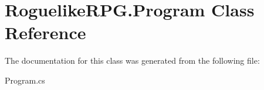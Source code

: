 \hypertarget{class_roguelike_r_p_g_1_1_program}{}\section{Roguelike\+R\+P\+G.\+Program Class Reference}
\label{class_roguelike_r_p_g_1_1_program}


The documentation for this class was generated from the following file\+:\begin{DoxyCompactItemize}
\item 
Program.\+cs\end{DoxyCompactItemize}
